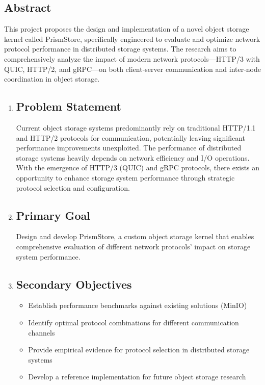 \documentclass[12pt]{article}
\begin{document}
\subsection*{Abstract}
This project proposes the design and implementation of a novel object storage kernel called PrismStore,
specifically engineered to evaluate and optimize network protocol performance in distributed storage systems.
The research aims to comprehensively analyze the impact of modern network protocols—HTTP/3 with QUIC, HTTP/2,
and gRPC—on both client-server communication and inter-node coordination in object storage.
\begin{enumerate}
    \item \subsection*{Problem Statement}
        Current object storage systems predominantly rely on traditional HTTP/1.1 and HTTP/2 protocols for communication, potentially leaving significant performance
        improvements unexploited. The performance of distributed storage systems heavily depends on network efficiency and I/O operations.
        With the emergence of HTTP/3 (QUIC) and gRPC protocols,
        there exists an opportunity to enhance storage system performance through strategic protocol selection and configuration.
    \item \subsection*{Primary Goal}
        Design and develop PrismStore, a custom object storage kernel that enables comprehensive evaluation of different network protocols' impact on
        storage system performance.
    \item \subsection*{Secondary Objectives}
        \begin{itemize}
            \item Establish performance benchmarks against existing solutions (MinIO)
            \item Identify optimal protocol combinations for different communication channels
            \item Provide empirical evidence for protocol selection in distributed storage systems
            \item Develop a reference implementation for future object storage research
        \end{itemize}


\end{enumerate}
\end{document}
